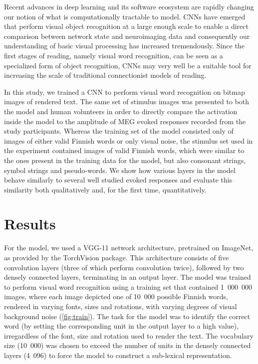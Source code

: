 \documentclass[a4paper, 10pt]{vanvliet_paper}
\begin{document}
Recent advances in deep learning and its software ecosystem are rapidly changing our notion of what is computationally tractable to model\cite{Richards2019}.
\Glspl{CNN} have emerged that perform visual object recognition at a large enough scale to enable a direct comparison between network state and neuroimaging data\cite{Schrimpf2018, Devereux2018, Yamins2016} and consequently our understanding of basic visual processing has increased tremendously\cite{Lindsay2020}.
Since the first stages of reading, namely visual word recognition, can be seen as a specialized form of object recognition, \glspl{CNN} may very well be a suitable tool for increasing the scale of traditional connectionist models of reading.

In this study, we trained a \gls{CNN} to perform visual word recognition on bitmap images of rendered text.
The same set of stimulus images was presented to both the model and human volunteers in order to directly compare the activation inside the model to the amplitude of \gls{MEG} evoked responses recorded from the study participants.
Whereas the training set of the model consisted only of images of either valid Finnish words or only visual noise, the stimulus set used in the experiment contained images of valid Finnish words, which were similar to the ones present in the training data for the model, but also consonant strings, symbol strings and pseudo-words.
We show how various layers in the model behave similarly to several well studied evoked responses and evaluate this similarity both qualitatively and, for the first time, quantitatively.

\section{Results}

For the model, we used a \textsc{VGG}-11\cite{Szegedy2015} network architecture, pretrained on ImageNet\cite{Russakovsky2015}, as provided by the TorchVision package\cite{Marcel2010}.
This architecture consists of five convolution layers (three of which perform convolution twice), followed by two densely connected layers, terminating in an output layer.
The model was trained to perform visual word recognition using a training set that contained 1~000~000 images, where each image depicted one of 10~000 possible Finnish words, rendered in varying fonts, sizes and rotations, with varying degrees of visual background noise (\autoref{fig:train}).
The task for the model was to identify the correct word (by setting the corresponding unit in the output layer to a high value), irregardless of the font, size and rotation used to render the text.
The vocabulary size (10~000) was chosen to exceed the number of units in the densely connected layers (4~096) to force the model to construct a sub-lexical representation.
\end{document}
